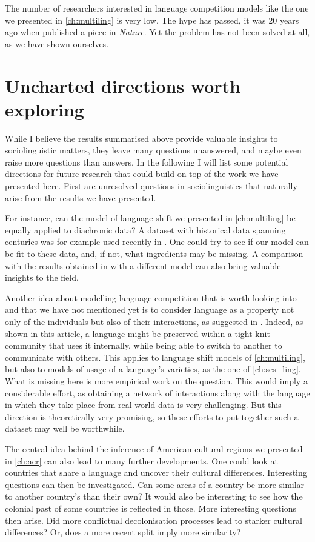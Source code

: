 \documentclass[../thesis.tex]{subfiles}
\begin{document}
The number of researchers interested in language competition models like the one we
presented in \cref{ch:multiling} is very low. The hype has passed, it was 20 years ago
when \citeauthor{AbramsModellingDynamics2003} published a piece in \textit{Nature}. Yet
the problem has not been solved at all, as we have shown ourselves. 



\section{Uncharted directions worth exploring}
While I believe the results summarised above provide valuable insights to
sociolinguistic matters, they leave many questions unanswered, and maybe even raise more
questions than answers. In the following I will list some potential directions for
future research that could build on top of the work we have presented here. First are
unresolved questions in sociolinguistics that naturally arise from the results we have
presented.

For instance, can the model of language shift we presented in \cref{ch:multiling} be
equally applied to diachronic data? A dataset with historical data spanning centuries
was for example used recently in \cite{SeoaneAreDutch2022}. One could try to see if our
model can be fit to these data, and, if not, what ingredients may be missing. A
comparison with the results obtained in \cite{SeoaneAreDutch2022} with a different model
can also bring valuable insights to the field. 

Another idea about modelling language competition that is worth looking into and that we
have not mentioned yet is to consider language as a property not only of the individuals
but also of their interactions, as suggested in \cite{CarroCoupledDynamics2016}. Indeed,
as shown in this article, a language might be preserved within a tight-knit community
that uses it internally, while being able to switch to another to communicate with
others. This applies to language shift models of \cref{ch:multiling}, but also to models
of usage of a language's varieties, as the one of \cref{ch:ses_ling}. What is missing
here is more empirical work on the question. This would imply a considerable effort, as
obtaining a network of interactions along with the language in which they take place
from real-world data is very challenging. But this direction is theoretically very
promising, so these efforts to put together such a dataset may well be worthwhile.

The central idea behind the inference of American cultural regions we presented in
\cref{ch:acr} can also lead to many further developments. One could look at countries
that share a language and uncover their cultural differences. Interesting questions can
then be investigated. Can some areas of a country be more similar to another country's
than their own? It would also be interesting to see how the colonial past of some
countries is reflected in those. More interesting questions then arise. Did more
conflictual decolonisation processes lead to starker cultural differences? Or, does a
more recent split imply more similarity?
\end{document}
